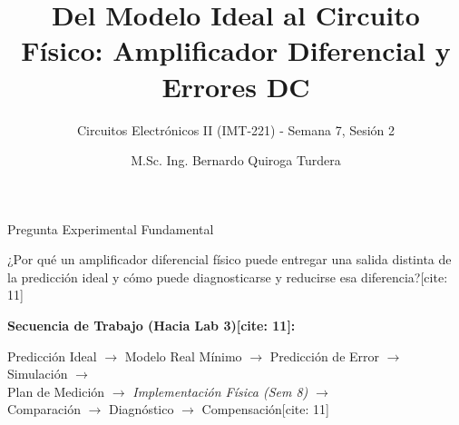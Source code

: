 \documentclass[aspectratio=169, xcolor={table,xcdraw}]{beamer}
\title[Op-Amps: Ideal a Real]{Del Modelo Ideal al Circuito Físico: Amplificador Diferencial y Errores DC}
\subtitle{Circuitos Electrónicos II (IMT-221) - Semana 7, Sesión 2}
\author[B. Quiroga Turdera]{M.Sc. Ing. Bernardo Quiroga Turdera}
\institute[UCB Tarija]{Universidad Católica Boliviana ``San Pablo'' — Sede Tarija}
\date{}
\begin{document}
\begin{frame}
    \titlepage
\end{frame}

\begin{frame}{Pregunta Experimental Fundamental}
    \begin{tcolorbox}[colback=ucbblue!5, colframe=ucbblue, title=\textbf{El Problema de Ingeniería[cite: 11]}]
        ¿Por qué un amplificador diferencial físico puede entregar una salida distinta de la predicción ideal y cómo puede diagnosticarse y reducirse esa diferencia?[cite: 11]
    \end{tcolorbox}
    
    \vspace{0.4cm}
    \textbf{Secuencia de Trabajo (Hacia Lab 3)[cite: 11]:}
    \begin{center}
        Predicción Ideal $\rightarrow$ Modelo Real Mínimo $\rightarrow$ Predicción de Error $\rightarrow$ Simulación $\rightarrow$ \\
        Plan de Medición $\rightarrow$ \textit{Implementación Física (Sem 8)} $\rightarrow$ \\
        Comparación $\rightarrow$ Diagnóstico $\rightarrow$ Compensación[cite: 11]
    \end{center}
\end{frame}
\end{document}
